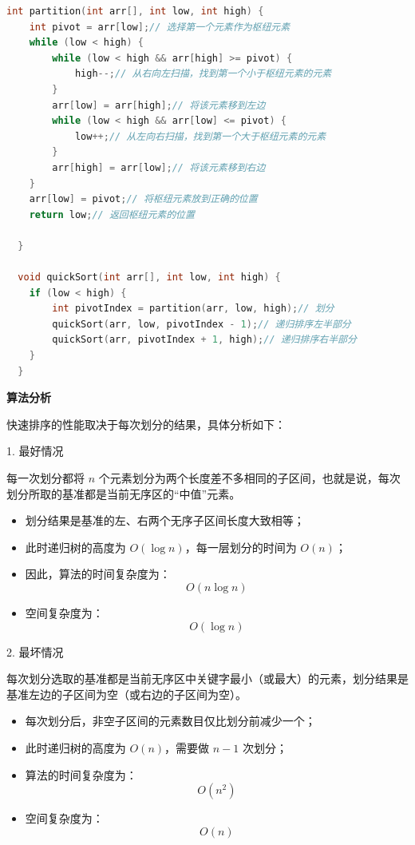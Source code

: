 \documentclass[lang=cn,newtx,10pt,scheme=chinese]{../elegantbook}
\begin{document}
\begin{lstlisting}[language=C++, caption=快速排序的算法代码]
  int partition(int arr[], int low, int high) {
    int pivot = arr[low];// 选择第一个元素作为枢纽元素
    while (low < high) {
        while (low < high && arr[high] >= pivot) {
            high--;// 从右向左扫描，找到第一个小于枢纽元素的元素
        }
        arr[low] = arr[high];// 将该元素移到左边
        while (low < high && arr[low] <= pivot) {
            low++;// 从左向右扫描，找到第一个大于枢纽元素的元素
        }
        arr[high] = arr[low];// 将该元素移到右边
    }
    arr[low] = pivot;// 将枢纽元素放到正确的位置
    return low;// 返回枢纽元素的位置

  }

  void quickSort(int arr[], int low, int high) {
    if (low < high) {
        int pivotIndex = partition(arr, low, high);// 划分
        quickSort(arr, low, pivotIndex - 1);// 递归排序左半部分
        quickSort(arr, pivotIndex + 1, high);// 递归排序右半部分
    }
  }
\end{lstlisting}

\textbf{算法分析}

快速排序的性能取决于每次划分的结果，具体分析如下：

1. 最好情况  

   每一次划分都将 $n$ 个元素划分为两个长度差不多相同的子区间，也就是说，每次划分所取的基准都是当前无序区的“中值”元素。  
   \begin{itemize}
     \item 划分结果是基准的左、右两个无序子区间长度大致相等；
     \item 此时递归树的高度为 $O(\log n)$，每一层划分的时间为 $O(n)$；
     \item 因此，算法的时间复杂度为：
       \[
       O(n \log n)
       \]
     \item 空间复杂度为：
       \[
       O(\log n)
       \]
   \end{itemize}

2. 最坏情况  

   每次划分选取的基准都是当前无序区中关键字最小（或最大）的元素，划分结果是基准左边的子区间为空（或右边的子区间为空）。  
   \begin{itemize}
     \item 每次划分后，非空子区间的元素数目仅比划分前减少一个；
     \item 此时递归树的高度为 $O(n)$，需要做 $n-1$ 次划分；
     \item 算法的时间复杂度为：
       \[
       O(n^2)
       \]
     \item 空间复杂度为：
       \[
       O(n)
       \]
   \end{itemize}
\end{document}
